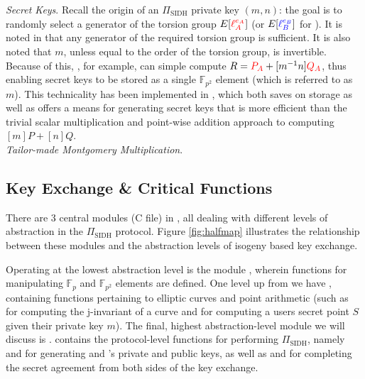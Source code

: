 \noindent
\emph{Secret Keys}. Recall the origin of an $\Pi_{\text{SIDH}}$ private key $(m, n)$: the goal is to randomly select a generator of the torsion group $E[\textcolor{red}{\ell_{A}^{e_A}}]$ (or $E[\textcolor{blue}{\ell_{B}^{e_B}}]$ for \bob). It is noted in \cite{djp} that any generator of the required torsion group is sufficient. It is also noted that $m$, unless equal to the order of the torsion group, is invertible. Because of this, \alice, for example, can simple compute $R = \textcolor{red}{P_A} + [m^{-1}n]\textcolor{red}{Q_A}$, thus enabling secret keys to be stored as a single $\mathbb{F}_{p^2}$ element (which is referred to as $m$). This technicality has been implemented in \sidh, which both saves on storage as well as offers a means for generating secret keys that is more efficient than the trivial scalar multiplication and point-wise addition approach to computing $[m]P + [n]Q$.\\

\noindent
\emph{Tailor-made Montgomery Multiplication}.

\subsection{Key Exchange \& Critical Functions}
\label{subsec:functions}

There are 3 central modules (C file) in \sidh, all dealing with different levels of abstraction in the $\Pi_{\text{SIDH}}$ protocol.  Figure \ref{fig:halfmap} illustrates the relationship between these modules and the abstraction levels of isogeny based key exchange. 

Operating at the lowest abstraction level is the module , wherein functions for manipulating $\mathbb{F}_{p}$ and $\mathbb{F}_{p^2}$ elements are defined. One level up from  we have , containing functions pertaining to elliptic curves and point arithmetic (such as  for computing the j-invariant of a curve and  for computing a users secret point $S$ given their private key $m$). The final, highest abstraction-level module we will discuss is .  contains the protocol-level functions for performing $\Pi_{\text{SIDH}}$, namely  and  for generating \alice and \bob's private and public keys, as well as  and  for completing the secret agreement from both sides of the key exchange.

